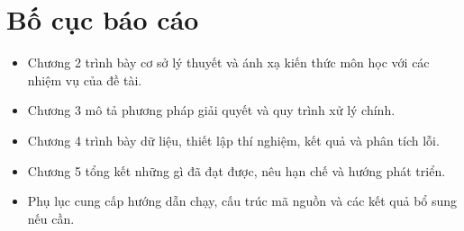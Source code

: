 \section{Bố cục báo cáo}
\begin{itemize}
    \item Chương 2 trình bày cơ sở lý thuyết và ánh xạ kiến thức môn học với các nhiệm vụ của đề tài.
    \item Chương 3 mô tả phương pháp giải quyết và quy trình xử lý chính.
    \item Chương 4 trình bày dữ liệu, thiết lập thí nghiệm, kết quả và phân tích lỗi.
    \item Chương 5 tổng kết những gì đã đạt được, nêu hạn chế và hướng phát triển.
    \item Phụ lục cung cấp hướng dẫn chạy, cấu trúc mã nguồn và các kết quả bổ sung nếu cần.
\end{itemize}